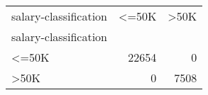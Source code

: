 \begin{tabular}{lrr}
\toprule
salary-classification &   <=50K &   >50K \\
salary-classification &         &        \\
\midrule
 <=50K                &   22654 &      0 \\
 >50K                 &       0 &   7508 \\
\bottomrule
\end{tabular}
